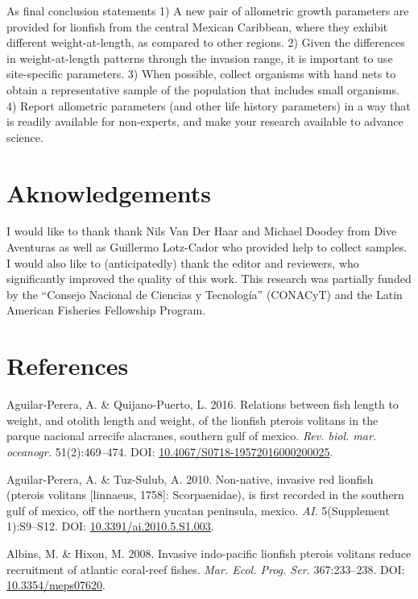 \documentclass[12pt,]{article}
\begin{document}
As final conclusion statements 1) A new pair of allometric growth
parameters are provided for lionfish from the central Mexican Caribbean,
where they exhibit different weight-at-length, as compared to other
regions. 2) Given the differences in weight-at-length patterns through
the invasion range, it is important to use site-specific parameters. 3)
When possible, collect organisms with hand nets to obtain a
representative sample of the population that includes small organisms.
4) Report allometric parameters (and other life history parameters) in a
way that is readily available for non-experts, and make your research
available to advance science.

\section{Aknowledgements}\label{aknowledgements}

I would like to thank thank Nils Van Der Haar and Michael Doodey from
Dive Aventuras as well as Guillermo Lotz-Cador who provided help to
collect samples. I would also like to (anticipatedly) thank the editor
and reviewers, who significantly improved the quality of this work. This
research was partially funded by the ``Consejo Nacional de Ciencias y
Tecnología'' (CONACyT) and the Latin American Fisheries Fellowship
Program.

\clearpage

\section{References}\label{references}

\hypertarget{refs}{}
\hypertarget{ref-aguilarperera_2016}{}
Aguilar-Perera, A. \& Quijano-Puerto, L. 2016. Relations between fish
length to weight, and otolith length and weight, of the lionfish pterois
volitans in the parque nacional arrecife alacranes, southern gulf of
mexico. \emph{Rev. biol. mar. oceanogr.} 51(2):469--474. DOI:
\href{https://doi.org/10.4067/S0718-19572016000200025}{10.4067/S0718-19572016000200025}.

\hypertarget{ref-aguilarperera_2010}{}
Aguilar-Perera, A. \& Tuz-Sulub, A. 2010. Non-native, invasive red
lionfish (pterois volitans {[}linnaeus, 1758{]}: Scorpaenidae), is first
recorded in the southern gulf of mexico, off the northern yucatan
peninsula, mexico. \emph{AI}. 5(Supplement 1):S9--S12. DOI:
\href{https://doi.org/10.3391/ai.2010.5.S1.003}{10.3391/ai.2010.5.S1.003}.

\hypertarget{ref-albins_2008}{}
Albins, M. \& Hixon, M. 2008. Invasive indo-pacific lionfish pterois
volitans reduce recruitment of atlantic coral-reef fishes. \emph{Mar.
Ecol. Prog. Ser.} 367:233--238. DOI:
\href{https://doi.org/10.3354/meps07620}{10.3354/meps07620}.
\end{document}
